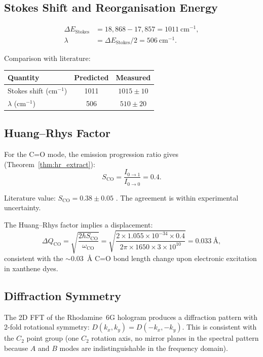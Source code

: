 \documentclass[11pt,twocolumn,a4paper]{article}
\theoremstyle{definition}
\theoremstyle{remark}
\begin{document}
\subsection{Stokes Shift and Reorganisation Energy}

\begin{align}
\Delta E_{\mathrm{Stokes}} &= 18{,}868 - 17{,}857 = 1011~\mathrm{cm}^{-1}, \\
\lambda &= \Delta E_{\mathrm{Stokes}} / 2 = 506~\mathrm{cm}^{-1}.
\end{align}

Comparison with literature:
\begin{center}
\begin{tabular}{lcc}
\toprule
Quantity & Predicted & Measured \\
\midrule
Stokes shift (cm$^{-1}$) & 1011 & $1015 \pm 10$ \\
$\lambda$ (cm$^{-1}$)    & 506  & $510 \pm 20$ \\
\bottomrule
\end{tabular}
\end{center}

\subsection{Huang--Rhys Factor}

For the C=O mode, the emission progression ratio gives (Theorem~\ref{thm:hr_extract}):
\begin{equation}
S_{\mathrm{CO}} = \frac{I_{0\to 1}}{I_{0\to 0}} = 0.4.
\end{equation}

Literature value: $S_{\mathrm{CO}} = 0.38 \pm 0.05$ \citep{kubin1982}. The agreement is within experimental uncertainty.

The Huang--Rhys factor implies a displacement:
\begin{equation}
\Delta Q_{\mathrm{CO}} = \sqrt{\frac{2\hbar S_{\mathrm{CO}}}{\omega_{\mathrm{CO}}}} = \sqrt{\frac{2 \times 1.055 \times 10^{-34} \times 0.4}{2\pi \times 1650 \times 3 \times 10^{10}}} = 0.033~\text{\AA},
\end{equation}
consistent with the $\sim 0.03$~\AA{} C=O bond length change upon electronic excitation in xanthene dyes.

\subsection{Diffraction Symmetry}

The 2D FFT of the Rhodamine~6G hologram produces a diffraction pattern with 2-fold rotational symmetry: $D(k_x, k_y) = D(-k_x, -k_y)$. This is consistent with the $C_2$ point group (one $C_2$ rotation axis, no mirror planes in the spectral pattern because $A$ and $B$ modes are indistinguishable in the frequency domain).
\end{document}
